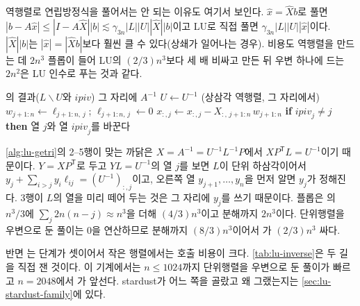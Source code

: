 역행렬로 연립방정식을 풀어서는 안 되는 이유도 여기서 보인다. $\hat x=\hat Xb$로 풀면 $|b-A\hat x|\le|I-A\hat X||b|\lesssim\gamma_{3n}|L||U||\hat X||b|$이고 LU로 직접 풀면 $\gamma_{3n}|L||U||\hat x|$이다. $|\hat X||b|$는 $|\hat x|=|\hat Xb|$보다 훨씬 클 수 있다(상쇄가 일어나는 경우). 비용도 역행렬을 만드는 데 $2n^3$ 플롭이 들어 LU의 $(2/3)n^3$보다 세 배 비싸고 만든 뒤 우변 하나에 드는 $2n^2$은 LU 인수로 푸는 것과 같다.

\begin{algorithm}[htbp]
\begin{algorithmic}[1]
\Require {}의 결과($L\backslash U$와 $\mathit{ipiv}$)
\Ensure 그 자리에 $A^{-1}$
\State $U\gets U^{-1}$ (상삼각 역행렬, 그 자리에서) 
 
  \State $w_{j+1:n}\gets\ell_{j+1:n,\,j}$; $\ell_{j+1:n,\,j}\gets0$
  \State $x_{:,j}\gets x_{:,j}-X_{:,\,j+1:n}\,w_{j+1:n}$ 
\EndFor
{} 
  \State \textbf{if} $\mathit{ipiv}_j\ne j$ \textbf{then} 열 $j$와 열 $\mathit{ipiv}_j$를 바꾼다
\EndFor
\end{algorithmic}
\caption{인수에서 역행렬 (LAPACK 의 블록 없는 꼴)}
\label{alg:lu-getri}
\end{algorithm}

\cref{alg:lu-getri}의 2--5행이 맞는 까닭은 $X=A^{-1}=U^{-1}L^{-1}P$에서 $XP^{\mathsf T}L=U^{-1}$이기 때문이다. $Y=XP^{\mathsf T}$로 두고 $YL=U^{-1}$의 열 $j$를 보면 $L$이 단위 하삼각이어서 $y_j+\sum_{i>j}y_i\ell_{ij}=(U^{-1})_{:,j}$이고, 오른쪽 열 $y_{j+1},\dots,y_n$을 먼저 알면 $y_j$가 정해진다. 3행이 $L$의 열을 미리 떼어 두는 것은 그 자리에 $y_j$를 쓰기 때문이다. 플롭은 의 $n^3/3$에 $\sum_j2n(n-j)\approx n^3$을 더해 $(4/3)n^3$이고 분해까지 $2n^3$이다. 단위행렬을 우변으로 둔 풀이는 $0$을 연산하므로 분해까지 $(8/3)n^3$이어서 가 $(2/3)n^3$ 싸다.

반면 는 단계가 셋이어서 작은 행렬에서는 호출 비용이 크다. \cref{tab:lu-inverse}은 두 길을 직접 잰 것이다. 이 기계에서는 $n\le1024$까지 단위행렬을 우변으로 둔 풀이가 빠르고 $n=2048$에서 가 앞선다. stardust가 어느 쪽을 골랐고 왜 그랬는지는 \cref{sec:lu-stardust-family}에 있다.

